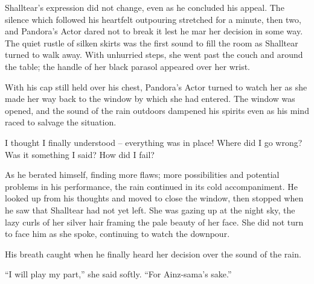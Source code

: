  

Shalltear’s expression did not change, even as he concluded his appeal. The silence which followed his heartfelt outpouring stretched for a minute, then two, and Pandora’s Actor dared not to break it lest he mar her decision in some way. The quiet rustle of silken skirts was the first sound to fill the room as Shalltear turned to walk away. With unhurried steps, she went past the couch and around the table; the handle of her black parasol appeared over her wrist.

 

With his cap still held over his chest, Pandora’s Actor turned to watch her as she made her way back to the window by which she had entered. The window was opened, and the sound of the rain outdoors dampened his spirits even as his mind raced to salvage the situation.

 

I thought I finally understood – everything was in place! Where did I go wrong? Was it something I said? How did I fail?

 

As he berated himself, finding more flaws; more possibilities and potential problems in his performance, the rain continued in its cold accompaniment. He looked up from his thoughts and moved to close the window, then stopped when he saw that Shalltear had not yet left. She was gazing up at the night sky, the lazy curls of her silver hair framing the pale beauty of her face. She did not turn to face him as she spoke, continuing to watch the downpour.

 

His breath caught when he finally heard her decision over the sound of the rain.

 

“I will play my part,” she said softly. “For Ainz-sama’s sake.”